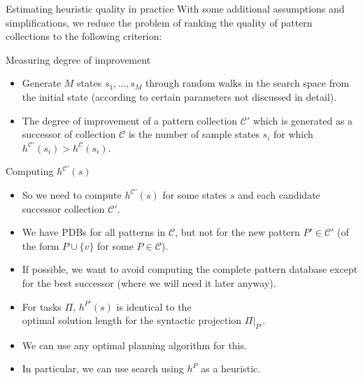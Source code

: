 \documentclass{gkibeamer}
\begin{document}
\begin{frame}{Estimating heuristic quality in practice}
  With some additional assumptions and simplifications, we reduce the
  problem of ranking the quality of pattern collections to the
  following criterion:

  \begin{block}{Measuring degree of improvement}
    \begin{itemize}
    \item Generate $M$ states $s_1, \dots, s_M$ through random walks
      in the search space from the initial state (according to certain
      parameters not discussed in detail).
    \item The \alert{degree of improvement} of a pattern collection
      $\mathcal C'$ which is generated as a successor of collection
      $\mathcal C$ is the \alert{number of sample states} $s_i$ for
      which \alert{$h^{\mathcal C'}(s_i) > h^{\mathcal C}(s_i)$}.
    \end{itemize}
  \end{block}
\end{frame}

\begin{frame}{Computing $h^{\mathcal C'}(s)$}
  \begin{itemize}
  \item So we need to compute $h^{\mathcal C'}(s)$ for some states $s$
    and each candidate successor collection $\mathcal C'$.
  \item We have PDBs for all patterns in $\mathcal C$, but not for the
    new pattern $P' \in \mathcal C'$ (of the form $P \cup \{v\}$ for
    some $P \in \mathcal C$).
  \item If possible, we want to avoid computing the complete pattern
    database except for the best successor (where we will need it
    later anyway).
  \end{itemize}

  \begin{itemize}
  \item For {\sasplus} tasks $\Pi$, $h^{P'}(s)$ is identical to the \\
    \alert{optimal solution length for the syntactic projection
      $\Pi|_{P'}$}.
  \item We can use \alert{any optimal planning algorithm} for this.
  \item In particular, we can use \alert{\astar} search using
    \alert{$h^P$} as a heuristic.
  \end{itemize}
\end{frame}
\end{document}
